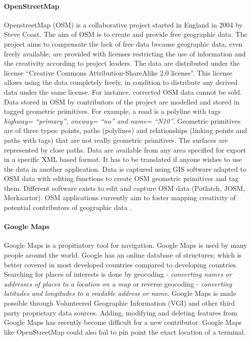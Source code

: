 \paragraph{OpenStreetMap}
OpenstreetMap (OSM) is a collaborative project started in England in 2004 by Steve Coast. The aim of OSM is to create and provide free geographic data. The project aims to compensate the lack of free data because geographic data, even freely available, are provided with licenses restricting the use of information and the creativity according to project leaders. The data are distributed under the license “Creative Commons Attribution-ShareAlike 2.0 license”. This license allows using the data completely freely, in condition to distribute any derived data under the same license. For instance, corrected OSM data cannot be sold.
Data stored in OSM by contributors of the project are modelled and stored in tagged geometric primitives. For example, a road is a polyline with tags \textit{highway= “primary”, oneway= “no” and name= “N10”}. Geometric primitives are of three types: points, paths (polylines) and relationships (linking points and paths with tags) that are not really geometric primitives. The surfaces are represented by close paths. Data are available from any area specified for export in a specific XML based format. It has to be translated if anyone wishes to use the data in another application. Data is captured using GIS software adapted to OSM data with editing functions to create OSM geometric primitives and tag them. Different software exists to edit and capture OSM data (Potlatch, JOSM, Merkaartor). OSM applications currently aim to foster mapping creativity of potential contributors of geographic data \citep{girres_quality_2010}.

\paragraph{Google Maps}
Google Maps is a propitiatory tool for navigation. Google Maps is used by many people around the world. Google has an online database of structures; which is better covered in most developed countries compared to developing countries. Searching for places of interests is done by geocoding - \textit{converting names or addresses of places to a location on a map} or reverse geocoding - \textit{converting latitudes and longitudes to a readable address or name}. Google Maps is made possible through Volunteered Geographic Information (VGI) and other third party proprietary data sources. Adding, modifying and deleting features from Google Maps has recently become difficult for a new contributor. Google Maps like OpenStreetMap could also fail to pin point the exact location of a terminal.

